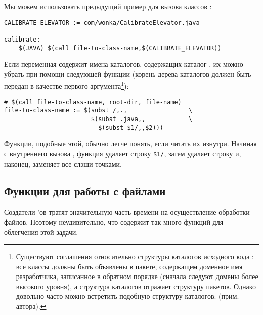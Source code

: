 Мы можем использовать предыдущий пример для вызова классов \Java{}:

{\footnotesize
\begin{verbatim}
CALIBRATE_ELEVATOR := com/wonka/CalibrateElevator.java

calibrate:
    $(JAVA) $(call file-to-class-name,$(CALIBRATE_ELEVATOR))
\end{verbatim}
}

Если переменная  содержит имена каталогов,
содержащих каталог , их можно убрать при помощи
следующей функции (корень дерева каталогов должен быть передан в
качестве первого аргумента\footnote{%
Существуют соглашения относительно структуры каталогов исходного кода
\Java{}: все классы должны быть объявлены в пакете, содержащем
доменное имя разработчика, записанное в обратном порядке (сначала
следуют домены более высокого уровня), а структура каталогов отражает
структуру пакетов. Однако довольно часто можно встретить подобную
структуру каталогов:  (прим.
автора).}):

{\footnotesize
\begin{verbatim}
# $(call file-to-class-name, root-dir, file-name)
file-to-class-name := $(subst /,.,                 \
                        $(subst .java,,            \
                          $(subst $1/,,$2)))
\end{verbatim}
}

Функции, подобные этой, обычно легче понять, если читать их изнутри.
Начиная с внутреннего вызова , функция удаляет строку
\texttt{\${}1/}, затем удаляет строку \command{.java} и, наконец,
заменяет все слэши точками.

\subsection{Функции для работы с файлами}
\label{sec:file_func}

Создатели \Makefile{}'ов тратят значительную часть времени на
осуществление обработки файлов. Поэтому неудивительно, что \GNUmake{}
содержит так много функций для облегчения этой задачи.

